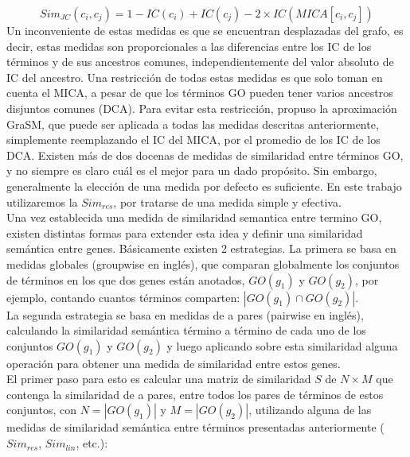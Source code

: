 \begin{equation}
	Sim_{JC}(c_i, c_j) = 1-IC(c_i)+IC(c_j)-2\times IC(MICA[c_i, c_j])
\end{equation}
Un inconveniente de estas medidas es que se encuentran desplazadas del grafo, es decir, estas medidas son proporcionales a las diferencias entre los IC de los términos y de sus ancestros comunes, independientemente del valor absoluto de IC del ancestro.
Una restricción de todas estas medidas es que solo toman en cuenta el MICA, a pesar de que los términos GO pueden tener varios ancestros disjuntos comunes (DCA). Para evitar esta restricción, \cite{Pesquita2009} propuso la aproximación GraSM, que puede ser aplicada a todas las medidas descritas anteriormente, simplemente reemplazando el IC del MICA, por el promedio de los IC de los DCA. 
Existen más de dos docenas de medidas de similaridad entre términos GO, y no siempre es claro cuál es el mejor para un dado propósito. Sin embargo, generalmente la elección de una medida por defecto es suficiente\cite{Bose2016}. En este trabajo utilizaremos la $Sim_{res}$, por tratarse de una medida simple y efectiva.\\
Una vez establecida una medida de similaridad semantica entre termino GO, existen distintas formas para extender esta idea y definir una similaridad semántica entre genes. Básicamente existen 2
estrategias. La primera se basa en medidas globales (groupwise en inglés), que comparan globalmente los conjuntos de términos en los que dos genes están anotados, $GO(g_1)$ y $GO(g_2)$, por ejemplo, contando cuantos términos comparten: $|GO(g_1) \cap GO(g_2)|$.\cite{Lee2004} \\
La segunda estrategia se basa en medidas de a pares (pairwise en inglés), calculando la similaridad semántica término a término de cada uno de los conjuntos $GO(g_1)$ y $GO(g_2)$ y luego aplicando sobre esta similaridad alguna operación para obtener una medida de similaridad entre estos genes.\\
El primer paso para esto es calcular una matriz de similaridad $S$ de $N\times M$ que contenga la similaridad de a pares, entre todos los pares de términos de estos conjuntos, con $N=|GO(g_1)|$ y $M=|GO(g_2)|$, utilizando alguna de las medidas de similaridad semántica entre términos presentadas anteriormente ($Sim_{res}$, $Sim_{lin}$, etc.):


